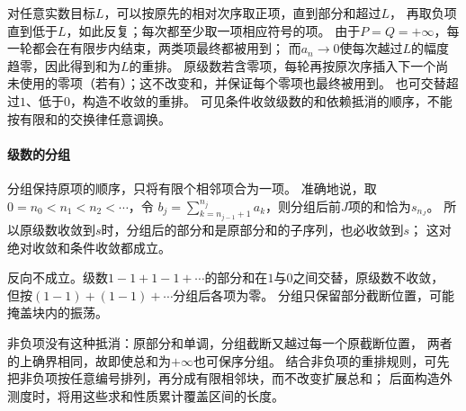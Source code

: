 对任意实数目标$L$，可以按原先的相对次序取正项，直到部分和超过$L$，
再取负项直到低于$L$，如此反复；每次都至少取一项相应符号的项。
由于$P=Q=+\infty$，每一轮都会在有限步内结束，两类项最终都被用到；
而$a_n\to0$使每次越过$L$的幅度趋零，因此得到和为$L$的重排。
原级数若含零项，每轮再按原次序插入下一个尚未使用的零项（若有）；这不改变和，并保证每个零项也最终被用到。
也可交替超过$1$、低于$0$，构造不收敛的重排。
可见条件收敛级数的和依赖抵消的顺序，不能按有限和的交换律任意调换。

\paragraph{级数的分组}
分组保持原项的顺序，只将有限个相邻项合为一项。
准确地说，取$0=n_0<n_1<n_2<\cdots$，令
$b_j=\sum_{k=n_{j-1}+1}^{n_j}a_k$，则分组后前$J$项的和恰为$s_{n_J}$。
所以原级数收敛到$s$时，分组后的部分和是原部分和的子序列，也必收敛到$s$；
这对绝对收敛和条件收敛都成立。

反向不成立。级数$1-1+1-1+\cdots$的部分和在$1$与$0$之间交替，原级数不收敛，
但按$(1-1)+(1-1)+\cdots$分组后各项为零。
分组只保留部分截断位置，可能掩盖块内的振荡。

非负项没有这种抵消：原部分和单调，分组截断又越过每一个原截断位置，
两者的上确界相同，故即使总和为$+\infty$也可保序分组。
结合非负项的重排规则，可先把非负项按任意编号排列，再分成有限相邻块，而不改变扩展总和；
后面构造外测度时，将用这些求和性质累计覆盖区间的长度。

\FloatBarrier
